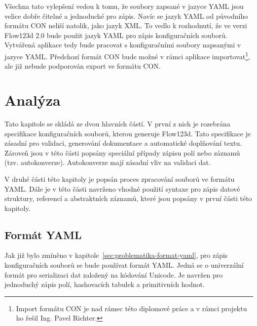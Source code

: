 \documentclass[FM,bw,DP]{tulthesis}
\begin{document}
Všechna tato vylepšení vedou k tomu, že soubory zapsané v jazyce YAML jsou velice dobře čitelné a jednoduché pro zápis. Navíc se jazyk YAML od původního formátu CON neliší natolik, jako jazyk XML. To vedlo k rozhodnutí, že ve verzi Flow123d 2.0 bude použit jazyk YAML pro zápis konfiguračních souborů. Vytvářená aplikace tedy bude pracovat s konfiguračními soubory napsanými v jazyce YAML. Předchozí formát CON bude možné v rámci aplikace importovat\footnote{Import formátu CON je nad rámec této diplomové práce a v rámci projektu ho řešil Ing. Pavel Richter.}, ale již nebude podporován export ve formátu CON.




\chapter{Analýza}

Tato kapitole se skládá ze dvou hlavních částí. V první z nich je rozebrána specifikace konfiguračních souborů, kterou generuje Flow123d. Tato specifikace je zásadní pro validaci, generování dokumentace a automatické doplňování textu. Zároveň jsou v této části popsány speciální případy zápisu polí nebo záznamů (tzv. autokonverze). Autokonverze mají zásadní vliv na validaci dat.

V druhé části této kapitoly je popsán proces zpracování souborů ve formátu YAML. Dále je v této části navrženo vhodné použití syntaxe pro zápis datové struktury, referencí a abstraktních záznamů, které jsou popsány v první části této kapitoly.


\section{Formát YAML}
Jak již bylo zmíněno v kapitole~\ref{sec:problematika-format-yaml}, pro zápis konfiguračních souborů se bude používat formát YAML. Jedná se o univerzální formát pro serializaci dat založený na kódování Unicode. Je navržen pro jednoduchý zápis polí, hashovacích tabulek a primitivních hodnot.
\end{document}
